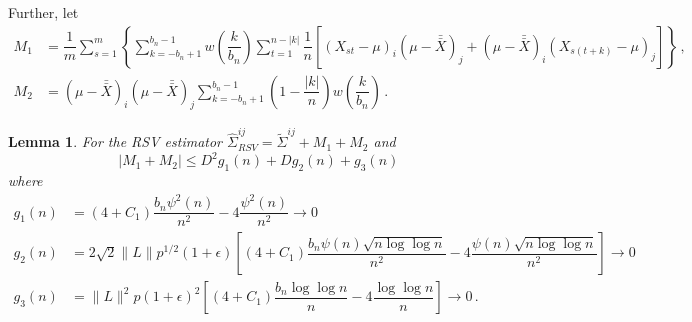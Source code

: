 \documentclass[11pt]{article}
\newtheorem{lemma}{Lemma}
\theoremstyle{remark}
\begin{document}
Further, let
\begin{align*}
  M_1 & = \dfrac{1}{m}\sum\limits_{s=1}^{m}\left\{\sum\limits_{k=-b_n+1}^{b_n-1}w\left(\dfrac{k}{b_n}\right)\sum\limits_{t=1}^{n-|k|}\dfrac{1}{n}\left[ \left(X_{st}-\mu \right)_i   \left(\mu-\bar{\bar{X}} \right)_j +    \left(\mu-\bar{\bar{X}} \right)_i  \left(X_{s(t+k)}-\mu \right)_j \right]\right\}\,, \\ 
M_2 &= \left(\mu-\bar{\bar{X}} \right)_i   \left(\mu-\bar{\bar{X}} \right)_j\sum\limits_{k=-b_n+1}^{b_n-1}\left(1-\dfrac{|k|}{n}\right)w\left(\dfrac{k}{b_n}\right)\,.
\end{align*}
\begin{lemma} \label{lemma:rsv_breakdown}
For the RSV estimator $\hat{\Sigma}_{RSV}^{ij} = \tilde{\Sigma}^{ij} + M_1 + M_2$ and 
\[
|M_1 + M_2| \leq D^2 g_1(n) + D g_2(n) + g_3(n)\,
\]
where
\begin{align*}
    g_1(n) &= (4+C_1)\dfrac{b_n \psi^2(n)}{n^2} - 4\dfrac{\psi^2(n)}{n^2} \to 0\\
    g_2(n) &= 2\sqrt{2}\|L\|p^{1/2}(1+\epsilon)\left[(4+C_1)\dfrac{b_n\psi(n)\sqrt{n\log \log n}}{n^2} - 4\dfrac{\psi(n)\sqrt{n\log \log n}}{n^2}\right] \to 0\\
    g_3(n) &= \|L\|^2 p (1+\epsilon)^2\left[(4+C_1)\dfrac{b_n \log\log n}{n} - 4 \dfrac{\log \log n}{n}\right] \to 0\,.
\end{align*}
\end{lemma}
\end{document}
